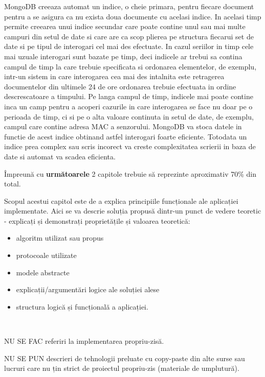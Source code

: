 MongoDB creeaza automat un indice, o cheie primara, pentru fiecare document pentru a se asigura ca nu exista doua documente cu acelasi indice. In acelasi timp 
permite creearea unui indice secundar care poate contine unul sau mai multe campuri din setul de date si care are ca scop plierea pe structura fiecarui set de date 
si pe tipul de interogari cel mai des efectuate. In cazul seriilor in timp cele mai uzuale interogari sunt bazate pe timp, deci indicele ar trebui sa contina campul 
de timp la care trebuie specificata si ordonarea elementelor, de exemplu, intr-un sistem in care interogarea cea mai des intalnita este retragerea documentelor 
din ultimele 24 de ore ordonarea trebuie efectuata in ordine descrescatoare a timpului. Pe langa campul de timp, indicele mai poate contine inca un camp pentru 
a acoperi cazurile in care interogarea se face nu doar pe o perioada de timp, ci si pe o alta valoare continuta in setul de date, de exemplu, campul care contine 
adresa MAC a senzorului. MongoDB va stoca datele in functie de acest indice obtinand astfel interogari foarte eficiente. Totodata un indice prea complex sau 
scris incorect va creste complexitatea scrierii in baza de date si automat va scadea eficienta. 


{\color{blue}Împreună cu \textbf{următoarele} 2 capitole trebuie să reprezinte aproximativ 70\% din total.\\}

Scopul acestui capitol este de a explica principiile funcționale ale aplicației implementate.
Aici se va descrie soluția propusă dintr-un punct de vedere teoretic - explicați și demonstrați proprietățile și valoarea teoretică:
\begin{itemize}
	\item algoritm utilizat sau propus
	\item protocoale utilizate
	\item modele abstracte
	\item explicații/argumentări logice ale soluției alese
	\item structura logică și funcțională a aplicației.
\end{itemize}


~\\\parbox[c]{\textwidth}{\color{red}\bfseries

NU SE FAC referiri la implementarea propriu-zisă.

NU SE PUN descrieri de tehnologii preluate cu copy-paste din alte surse sau lucruri care nu țin strict de proiectul propriu-zis (materiale de umplutură).
}

